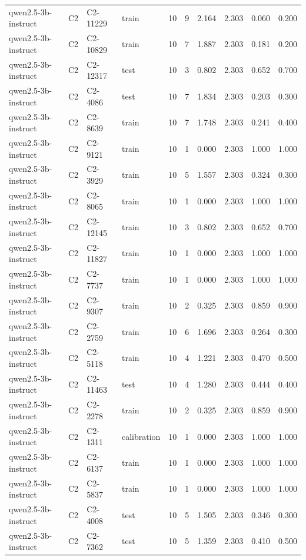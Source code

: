 \begin{table}
\begin{tabular}{llllrrrrrr}
qwen2.5-3b-instruct & C2 & C2-11229 & train & 10 & 9 & 2.164 & 2.303 & 0.060 & 0.200 \\
qwen2.5-3b-instruct & C2 & C2-10829 & train & 10 & 7 & 1.887 & 2.303 & 0.181 & 0.200 \\
qwen2.5-3b-instruct & C2 & C2-12317 & test & 10 & 3 & 0.802 & 2.303 & 0.652 & 0.700 \\
qwen2.5-3b-instruct & C2 & C2-4086 & test & 10 & 7 & 1.834 & 2.303 & 0.203 & 0.300 \\
qwen2.5-3b-instruct & C2 & C2-8639 & train & 10 & 7 & 1.748 & 2.303 & 0.241 & 0.400 \\
qwen2.5-3b-instruct & C2 & C2-9121 & train & 10 & 1 & 0.000 & 2.303 & 1.000 & 1.000 \\
qwen2.5-3b-instruct & C2 & C2-3929 & train & 10 & 5 & 1.557 & 2.303 & 0.324 & 0.300 \\
qwen2.5-3b-instruct & C2 & C2-8065 & train & 10 & 1 & 0.000 & 2.303 & 1.000 & 1.000 \\
qwen2.5-3b-instruct & C2 & C2-12145 & train & 10 & 3 & 0.802 & 2.303 & 0.652 & 0.700 \\
qwen2.5-3b-instruct & C2 & C2-11827 & train & 10 & 1 & 0.000 & 2.303 & 1.000 & 1.000 \\
qwen2.5-3b-instruct & C2 & C2-7737 & train & 10 & 1 & 0.000 & 2.303 & 1.000 & 1.000 \\
qwen2.5-3b-instruct & C2 & C2-9307 & train & 10 & 2 & 0.325 & 2.303 & 0.859 & 0.900 \\
qwen2.5-3b-instruct & C2 & C2-2759 & train & 10 & 6 & 1.696 & 2.303 & 0.264 & 0.300 \\
qwen2.5-3b-instruct & C2 & C2-5118 & train & 10 & 4 & 1.221 & 2.303 & 0.470 & 0.500 \\
qwen2.5-3b-instruct & C2 & C2-11463 & test & 10 & 4 & 1.280 & 2.303 & 0.444 & 0.400 \\
qwen2.5-3b-instruct & C2 & C2-2278 & train & 10 & 2 & 0.325 & 2.303 & 0.859 & 0.900 \\
qwen2.5-3b-instruct & C2 & C2-1311 & calibration & 10 & 1 & 0.000 & 2.303 & 1.000 & 1.000 \\
qwen2.5-3b-instruct & C2 & C2-6137 & train & 10 & 1 & 0.000 & 2.303 & 1.000 & 1.000 \\
qwen2.5-3b-instruct & C2 & C2-5837 & train & 10 & 1 & 0.000 & 2.303 & 1.000 & 1.000 \\
qwen2.5-3b-instruct & C2 & C2-4008 & test & 10 & 5 & 1.505 & 2.303 & 0.346 & 0.300 \\
qwen2.5-3b-instruct & C2 & C2-7362 & test & 10 & 5 & 1.359 & 2.303 & 0.410 & 0.500 \\

\end{tabular}
\end{table}
